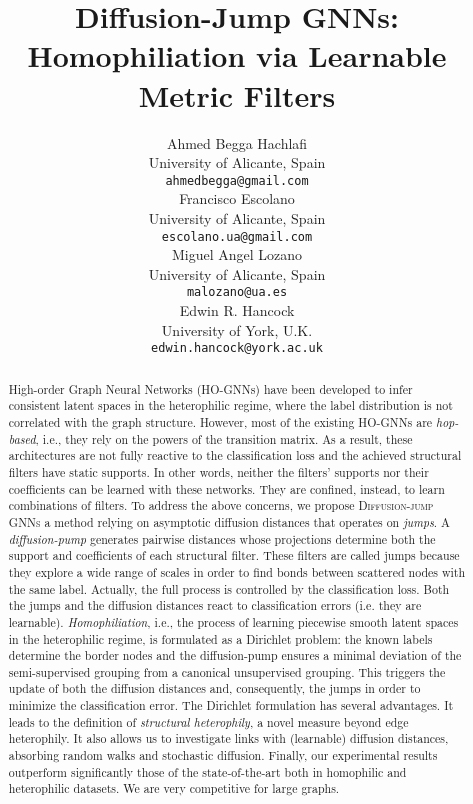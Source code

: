 \documentclass{article}
\title{Diffusion-Jump GNNs:\\
Homophiliation via Learnable Metric Filters}
\author{Ahmed Begga Hachlafi \\
University of Alicante, Spain\\
\texttt{ahmedbegga@gmail.com} \\
\And
   Francisco Escolano \\
   University of Alicante, Spain\\
   \texttt{escolano.ua@gmail.com} \\
   \And
   Miguel Angel Lozano \\
   University of Alicante, Spain\\
   \texttt{malozano@ua.es} \\
   \And
   Edwin R. Hancock \\
   University of York, U.K.\\
   \texttt{edwin.hancock@york.ac.uk} \\
}
\theoremstyle{plain}
\theoremstyle{definition}
\begin{document}
\maketitle


\begin{abstract}
  High-order Graph Neural Networks (HO-GNNs) have been developed to infer consistent 
  latent spaces in the heterophilic regime, where the label distribution is not correlated 
  with the graph structure. However, most of the existing HO-GNNs are \emph{hop-based}, i.e., 
  they rely on the powers of the transition matrix. 
  As a result, these architectures are not fully reactive to the classification loss and the 
  achieved structural filters have static supports. In other words, neither the filters' supports 
  nor their coefficients can be learned with these networks. They are confined, instead, to learn combinations 
  of filters. 
To address the above concerns, we propose \textsc{Diffusion-jump GNNs} a method relying on 
  asymptotic diffusion distances that operates on \emph{jumps}. A \emph{diffusion-pump} generates 
  pairwise distances whose projections determine both the support and coefficients of each structural 
  filter. These filters are called jumps because they explore a wide range of scales in order to find  
  bonds between scattered nodes with the same label. Actually, the full process is controlled by the 
  classification loss. Both the jumps and the diffusion distances react to classification errors (i.e. 
  they are learnable). 
\emph{Homophiliation}, i.e., the process of learning piecewise smooth latent spaces in the heterophilic 
  regime, is formulated as a Dirichlet problem: the known labels determine the border nodes and the diffusion-pump 
  ensures a minimal deviation of the semi-supervised grouping from a canonical unsupervised grouping. This triggers the update of both the 
  diffusion distances and, consequently, the jumps in order to minimize the classification error. 
The Dirichlet formulation has several advantages. It leads to the definition of \emph{structural heterophily}, a novel 
  measure beyond edge heterophily. It also allows us to investigate links with (learnable) diffusion distances, absorbing random walks and 
  stochastic diffusion. 
Finally, our experimental results outperform significantly those of the state-of-the-art both in homophilic and heterophilic 
  datasets. We are very competitive for large graphs. 
\end{abstract}
\end{document}
